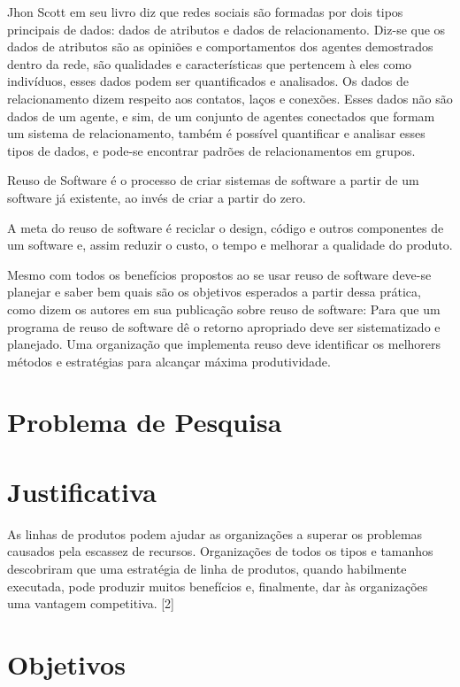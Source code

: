 Jhon Scott em seu livro \cite{Scott:Carrington:2011} diz que redes sociais são formadas por dois tipos principais de dados: dados de atributos e dados de relacionamento. Diz-se que os dados de atributos são as opiniões e comportamentos dos agentes demostrados dentro da rede, são qualidades e características que pertencem à eles como indivíduos, esses dados podem ser quantificados e analisados. Os dados de relacionamento dizem respeito aos contatos, laços e conexões. Esses dados não são dados de um agente, e sim, de um conjunto de agentes conectados que formam um sistema de relacionamento, também é possível quantificar e analisar esses tipos de dados, e pode-se encontrar padrões de relacionamentos em grupos.

Reuso de Software é o processo de criar sistemas de software a partir de um software já existente, ao invés de criar a partir do zero.\cite{Krueger:1992}

A meta do reuso de software é reciclar o design, código e outros componentes de um software e, assim reduzir o custo, o tempo e melhorar a qualidade do produto.\cite{Keswani:Joshi:Jatain:2014}

Mesmo com todos os benefícios propostos ao se usar reuso de software deve-se planejar e saber bem quais são os objetivos esperados a partir dessa prática, como dizem os autores em sua publicação sobre reuso de software: Para que um programa de reuso de software dê o retorno apropriado deve ser sistematizado e planejado. Uma organização que implementa reuso deve identificar os melhorers métodos e estratégias para alcançar máxima produtividade.\cite{Keswani:Joshi:Jatain:2014}

\section*{Problema de Pesquisa}

\section*{Justificativa}

As linhas de produtos podem ajudar as organizações a superar os problemas causados pela escassez de recursos. Organizações de todos os tipos e tamanhos descobriram que uma estratégia de linha de produtos, quando habilmente executada, pode produzir muitos benefícios e, finalmente, dar às organizações uma vantagem competitiva. [2]

\section*{Objetivos}

